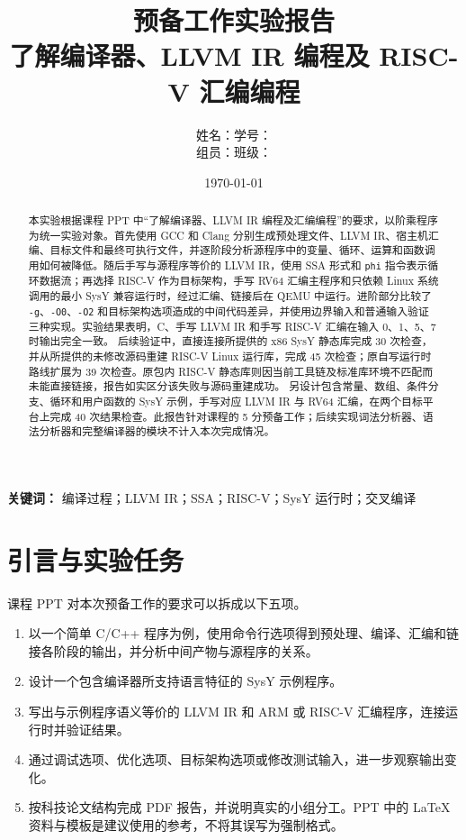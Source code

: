 \documentclass[UTF8,a4paper,12pt]{ctexart}
\title{预备工作实验报告\\了解编译器、LLVM IR 编程及 RISC-V 汇编编程}
\author{姓名：\underline{\hspace{3.5cm}}\quad 学号：\underline{\hspace{3.5cm}}\\
组员：\underline{\hspace{3.5cm}}\quad 班级：\underline{\hspace{3.5cm}}}
\date{\today}
\begin{document}
\maketitle

\begin{abstract}
本实验根据课程 PPT 中“了解编译器、LLVM IR 编程及汇编编程”的要求，以阶乘程序为统一实验对象。首先使用 GCC 和 Clang 分别生成预处理文件、LLVM IR、宿主机汇编、目标文件和最终可执行文件，并逐阶段分析源程序中的变量、循环、运算和函数调用如何被降低。随后手写与源程序等价的 LLVM IR，使用 SSA 形式和 \texttt{phi} 指令表示循环数据流；再选择 RISC-V 作为目标架构，手写 RV64 汇编主程序和只依赖 Linux 系统调用的最小 SysY 兼容运行时，经过汇编、链接后在 QEMU 中运行。进阶部分比较了 \texttt{-g}、\texttt{-O0}、\texttt{-O2} 和目标架构选项造成的中间代码差异，并使用边界输入和普通输入验证三种实现。实验结果表明，C、手写 LLVM IR 和手写 RISC-V 汇编在输入 0、1、5、7 时输出完全一致。
后续验证中，直接连接所提供的 x86 SysY 静态库完成 30 次检查，并从所提供的未修改源码重建 RISC-V Linux 运行库，完成 45 次检查；原自写运行时路线扩展为 39 次检查。原包内 RISC-V 静态库则因当前工具链及标准库环境不匹配而未能直接链接，报告如实区分该失败与源码重建成功。
另设计包含常量、数组、条件分支、循环和用户函数的 SysY 示例，手写对应 LLVM IR 与 RV64 汇编，在两个目标平台上完成 40 次结果检查。此报告针对课程的 5 分预备工作；后续实现词法分析器、语法分析器和完整编译器的模块不计入本次完成情况。
\end{abstract}

\noindent\textbf{关键词：} 编译过程；LLVM IR；SSA；RISC-V；SysY 运行时；交叉编译

\section{引言与实验任务}

课程 PPT 对本次预备工作的要求可以拆成以下五项。

\begin{enumerate}
  \item 以一个简单 C/C++ 程序为例，使用命令行选项得到预处理、编译、汇编和链接各阶段的输出，并分析中间产物与源程序的关系。
  \item 设计一个包含编译器所支持语言特征的 SysY 示例程序。
  \item 写出与示例程序语义等价的 LLVM IR 和 ARM 或 RISC-V 汇编程序，连接运行时并验证结果。
  \item 通过调试选项、优化选项、目标架构选项或修改测试输入，进一步观察输出变化。
  \item 按科技论文结构完成 PDF 报告，并说明真实的小组分工。PPT 中的 LaTeX 资料与模板是建议使用的参考，不将其误写为强制格式。
\end{enumerate}
\end{document}
